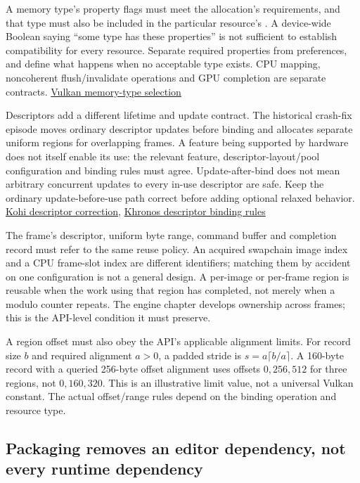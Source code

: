A memory type's property flags must meet the allocation's requirements, and that type must also be included in the particular resource's . A device-wide Boolean saying ``some type has these properties'' is not sufficient to establish compatibility for every resource. Separate required properties from preferences, and define what happens when no acceptable type exists. CPU mapping, noncoherent flush/invalidate operations and GPU completion are separate contracts. \href{https://docs.vulkan.org/spec/latest/chapters/memory.html}{Vulkan memory-type selection}

Descriptors add a different lifetime and update contract. The historical crash-fix episode moves ordinary descriptor updates before binding and allocates separate uniform regions for overlapping frames. A feature being supported by hardware does not itself enable its use: the relevant feature, descriptor-layout/pool configuration and binding rules must agree. Update-after-bind does not mean arbitrary concurrent updates to every in-use descriptor are safe. Keep the ordinary update-before-use path correct before adding optional relaxed behavior. \href{https://www.youtube.com/watch?v=U4QvUeUL37Y}{Kohi descriptor correction}, \href{https://docs.vulkan.org/spec/latest/chapters/descriptorsets.html}{Khronos descriptor binding rules}

The frame's descriptor, uniform byte range, command buffer and completion record must refer to the same reuse policy. An acquired swapchain image index and a CPU frame-slot index are different identifiers; matching them by accident on one configuration is not a general design. A per-image or per-frame region is reusable when the work using that region has completed, not merely when a modulo counter repeats. The engine chapter develops ownership across frames; this is the API-level condition it must preserve.

A region offset must also obey the API's applicable alignment limits. For record size \(b\) and required alignment \(a>0\), a padded stride is \(s=a\lceil b/a\rceil\). A 160-byte record with a queried 256-byte offset alignment uses offsets \(0,256,512\) for three regions, not \(0,160,320\). This is an illustrative limit value, not a universal Vulkan constant. The actual offset/range rules depend on the binding operation and resource type.

\subsection{Packaging removes an editor dependency, not every runtime dependency}\label{01-foundations-i-ch008-packaging-removes-an-editor-dependency-not-every-runtime-dependency}

